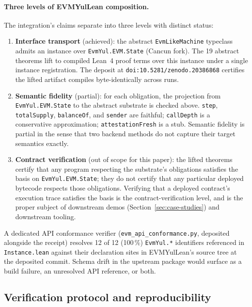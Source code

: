 \documentclass[11pt,a4paper]{article}
\begin{document}
\paragraph{Three levels of EVMYulLean composition.} The integration's claims separate into three levels with distinct status:

\begin{enumerate}
  \item \textbf{Interface transport} (achieved): the abstract \texttt{EvmLikeMachine} typeclass admits an instance over \texttt{EvmYul.EVM.State} (Cancun fork). The 19 abstract theorems lift to compiled Lean~4 proof terms over this instance under a single instance registration. The deposit at \texttt{doi:10.5281/zenodo.20386868} certifies the lifted artifact compiles byte-identically across runs.
  \item \textbf{Semantic fidelity} (partial): for each obligation, the projection from \texttt{EvmYul.EVM.State} to the abstract substrate is checked above. \texttt{step}, \texttt{totalSupply}, \texttt{balanceOf}, and \texttt{sender} are faithful; \texttt{callDepth} is a conservative approximation; \texttt{attestationFresh} is a stub. Semantic fidelity is partial in the sense that two backend methods do not capture their target semantics exactly.
  \item \textbf{Contract verification} (out of scope for this paper): the lifted theorems certify that any program respecting the substrate's obligations satisfies the basis on \texttt{EvmYul.EVM.State}; they do not certify that any particular deployed bytecode respects those obligations. Verifying that a deployed contract's execution trace satisfies the basis is the contract-verification level, and is the proper subject of downstream demos (Section~\ref{sec:case-studies}) and downstream tooling.
\end{enumerate}

A dedicated API conformance verifier (\texttt{evm\_api\_conformance.py}, deposited alongside the receipt) resolves 12 of 12 (100\,\%) \texttt{EvmYul.*} identifiers referenced in \texttt{Instance.lean} against their declaration sites in EVMYulLean's source tree at the deposited commit. Schema drift in the upstream package would surface as a build failure, an unresolved API reference, or both.

\subsection{Verification protocol and reproducibility}\label{sec:evmyul-reproducibility}
\end{document}

